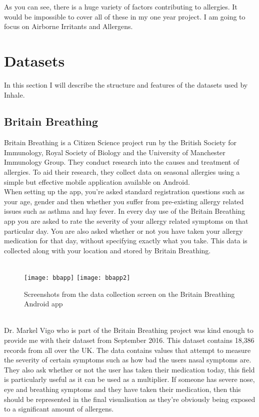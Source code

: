 As you can see, there is a huge variety of factors contributing to allergies. It would be impossible to cover all of these in my one year project. I am going to focus on Airborne Irritants and Allergens.


\section{Datasets}

In this section I will describe the structure and features of the datasets used by Inhale.\\

\subsection{Britain Breathing}

Britain Breathing is a Citizen Science project run by the British Society for Immunology, Royal Society of Biology and the University of Manchester Immunology Group. They conduct research into the causes and treatment of allergies. To aid their research, they collect data on seasonal allergies using a simple but effective mobile application available on Android.\\

When setting up the app, you're asked standard registration questions such as your age, gender and then whether you suffer from pre-existing allergy related issues such as asthma and hay fever. In every day use of the Britain Breathing app you are asked to rate the severity of your allergy related symptoms on that particular day. You are also asked whether or not you have taken your allergy medication for that day, without specifying exactly what you take. This data is collected along with your location and stored by Britain Breathing.

\begin{SCfigure}
\caption{Screenshots from the data collection screen on the Britain Breathing Android app}\\
\centering
\texttt{[image: bbapp]}
\centering
\texttt{[image: bbapp2]}
\end{SCfigure}\\

Dr. Markel Vigo who is part of the Britain Breathing project was kind enough to provide me with their dataset from September 2016. This dataset contains 18,386 records from all over the UK. The data contains values that attempt to measure the severity of certain symptoms such as how bad the users nasal symptoms are. They also ask whether or not the user has taken their medication today, this field is particularly useful as it can be used as a multiplier. If someone has severe nose, eye and breathing symptoms and they have taken their medication, then this should be represented in the final visualisation as they're obviously being exposed to a significant amount of allergens.\\


